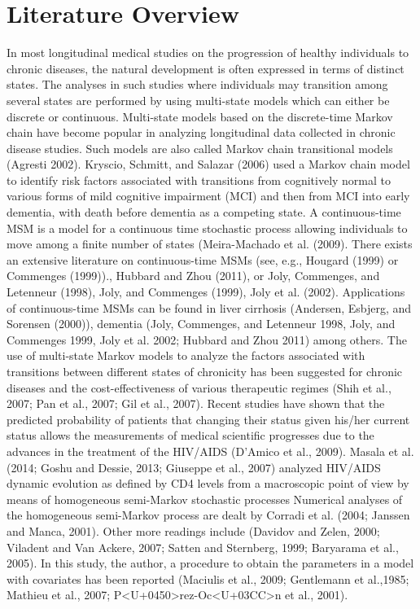 \documentclass[11pt,a4paper]{article}
\begin{document}
\section{Literature Overview}
\begin{multicols}{2}
In most longitudinal medical studies on the progression of healthy individuals to chronic diseases, the natural development is often expressed in terms of distinct states. The analyses in such studies where individuals may transition among several states are performed by using multi-state models which can either be discrete or continuous. Multi-state models based on the discrete-time Markov chain have become popular in analyzing longitudinal data collected in chronic disease studies. Such models are also called Markov chain transitional models (Agresti 2002). Kryscio, Schmitt, and Salazar (2006) used a Markov chain model to identify risk factors
associated with transitions from cognitively normal to various forms of mild cognitive impairment (MCI) and then from MCI into early dementia, with death before dementia as a competing state. A continuous-time MSM is a model for a continuous time stochastic process allowing individuals to move among a finite number of states (Meira-Machado et al. (2009). There exists an extensive literature on continuous-time MSMs (see, e.g., Hougard (1999) or Commenges (1999))., Hubbard and Zhou (2011), or Joly, Commenges, and Letenneur (1998), Joly, and Commenges (1999), Joly et al. (2002). Applications of continuous-time MSMs can be found in liver cirrhosis (Andersen, Esbjerg, and Sorensen (2000)), dementia (Joly, Commenges, and Letenneur 1998, Joly, and Commenges 1999, Joly et al. 2002; Hubbard and Zhou 2011) among others.
The use of multi-state Markov models to analyze the factors associated with transitions between different states of chronicity has been suggested for chronic diseases and the cost-effectiveness of various therapeutic regimes (Shih et al., 2007; Pan et al., 2007; Gil et al., 2007). Recent studies have shown that the predicted probability of patients that changing their status given
his/her current status allows the measurements of medical scientific progresses due to the advances in the treatment of the HIV/AIDS (D'Amico et al., 2009). Masala et al. (2014; Goshu and Dessie, 2013; Giuseppe et al., 2007) analyzed HIV/AIDS dynamic evolution as defined by CD4 levels from a macroscopic point of view by means of homogeneous semi-Markov stochastic processes Numerical analyses of the homogeneous semi-Markov process are dealt by
Corradi et al. (2004; Janssen and Manca, 2001). Other more readings include (Davidov and Zelen, 2000; Viladent and Van Ackere, 2007; Satten and Sternberg, 1999; Baryarama et al., 2005). In this study, the author, a procedure to obtain the parameters in a model with covariates has been reported (Maciulis et al., 2009; Gentlemann et al.,1985; Mathieu et al., 2007; P<U+0450>rez-Oc<U+03CC>n et al., 2001).
\end{multicols}
\end{document}
